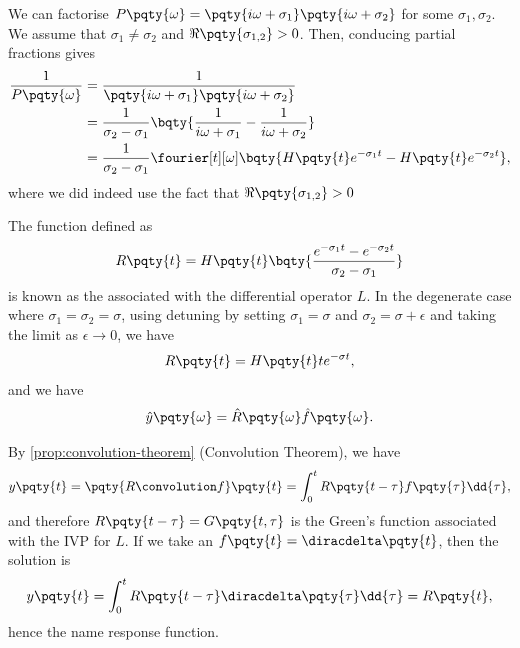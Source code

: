 We can factorise \(P\pqty{\omega} = \pqty{i \omega + \sigma_1} \pqty{i \omega + \sigma_2}\) for some \(\sigma_1, \sigma_2\). We assume that \(\sigma_1 \neq \sigma_2\) and \(\Re\pqty{\sigma_{1, 2}} > 0\). Then, conducing partial fractions gives
\begin{subequations}
    \begin{align}
        \frac{1}{P\pqty{\omega}} &= \frac{1}{\pqty{i \omega + \sigma_1} \pqty{i \omega + \sigma_2}} \\ 
        &= \frac{1}{\sigma_2 - \sigma_1} \bqty{\frac{1}{i \omega + \sigma_1} - \frac{1}{i \omega + \sigma_2}} \\
        &= \frac{1}{\sigma_2 - \sigma_1} \fourier[t][\omega] \bqty{H\pqty{t} e^{- \sigma_1 t} - H\pqty{t} e^{- \sigma_2 t}},
    \end{align}
\end{subequations}
where we did indeed use the fact that \(\Re\pqty{\sigma_{1, 2}} > 0\)

The function defined as
\begin{equation}
    R\pqty{t} = H\pqty{t} \bqty{\frac{e^{- \sigma_1 t} - e^{- \sigma_2 t}}{\sigma_2 - \sigma_1}}
\end{equation}
is known as the  associated with the differential operator \(L\). In the degenerate case where \(\sigma_1 = \sigma_2 = \sigma\), using detuning by setting \(\sigma_1 = \sigma\) and \(\sigma_2 = \sigma + \epsilon\) and taking the limit as \(\epsilon \to 0\), we have
\begin{equation}
    R\pqty{t} = H\pqty{t} t e^{- \sigma t},
\end{equation}
and we have
\begin{equation}
    \hat{y}\pqty{\omega} = \hat{R}\pqty{\omega} \hat{f}\pqty{\omega}.
\end{equation}

By \autoref{prop:convolution-theorem} (Convolution Theorem), we have
\begin{equation}
    y\pqty{t} = \pqty{R \convolution f} \pqty{t} = \int_{0}^{t} R\pqty{t - \tau} f\pqty{\tau} \dd{\tau},
\end{equation}
and therefore \(R\pqty{t - \tau} = G\pqty{t, \tau}\) is the Green's function associated with the IVP for \(L\). If we take an  \(f\pqty{t} = \diracdelta\pqty{t}\), then the solution is
\begin{equation}
    y\pqty{t} = \int_{0}^{t} R\pqty{t - \tau} \diracdelta\pqty{\tau} \dd{\tau} = R\pqty{t},
\end{equation}
hence the name response function.

